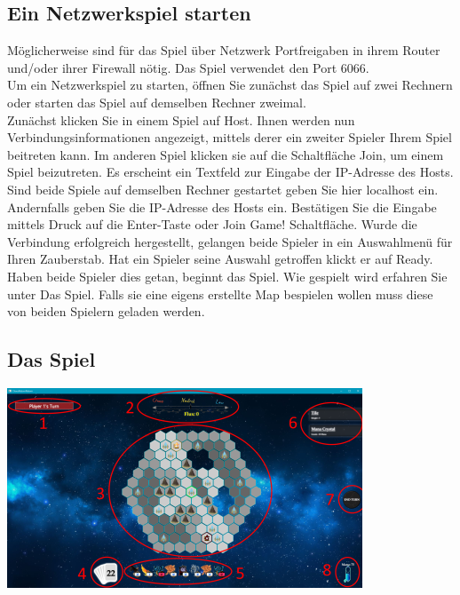 \documentclass[a4paper,12pt]{scrartcl}
\begin{document}
	\subsection{Ein Netzwerkspiel starten}
	Möglicherweise sind für das Spiel über Netzwerk Portfreigaben in ihrem Router und/oder ihrer Firewall nötig. Das Spiel verwendet den Port 6066.\\
	Um ein Netzwerkspiel zu starten, öffnen Sie zunächst das Spiel auf zwei Rechnern oder starten das Spiel auf demselben Rechner zweimal.\\
	Zunächst klicken Sie in einem Spiel auf \glqq Host\grqq\hspace{0.05em}.
	Ihnen werden nun Verbindungsinformationen angezeigt, mittels derer ein zweiter Spieler Ihrem Spiel beitreten kann.
	Im anderen Spiel klicken sie auf die Schaltfläche \glqq Join\grqq\hspace{0.05em}, um einem Spiel beizutreten.
	Es erscheint ein Textfeld zur Eingabe der IP-Adresse des Hosts.
	Sind beide Spiele auf demselben Rechner gestartet geben Sie hier \glqq localhost\grqq\hspace{0.05em} ein.
	Andernfalls geben Sie die IP-Adresse des Hosts ein.
	Bestätigen Sie die Eingabe mittels Druck auf die Enter-Taste oder \glqq Join Game!\grqq\hspace{0.05em} Schaltfläche.
	Wurde die Verbindung erfolgreich hergestellt, gelangen beide Spieler in ein Auswahlmenü für Ihren Zauberstab.
	Hat ein Spieler seine Auswahl getroffen klickt er auf \glqq Ready\grqq\hspace{0.05em}.
	Haben beide Spieler dies getan, beginnt das Spiel.
	Wie gespielt wird erfahren Sie unter \glqq Das Spiel\grqq\hspace{0.05em}.
	Falls sie eine eigens erstellte Map bespielen wollen muss diese von beiden Spielern geladen werden.
	
	\subsection{Das Spiel}
	
	\includegraphics[width=\textwidth]{Prog2_EA_V2/screenshots/DsaSpiel2.png}
	
\end{document}
